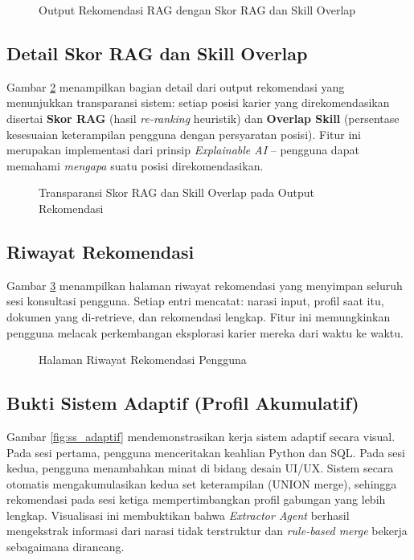 \begin{figure}[H]
  \centering
  \caption{Output Rekomendasi RAG dengan Skor RAG dan Skill Overlap}
  \label{fig:ss_response}
\end{figure}

\subsection{Detail Skor RAG dan Skill Overlap}

Gambar \ref{fig:ss_skor_rag} menampilkan bagian detail dari output rekomendasi yang
menunjukkan transparansi sistem: setiap posisi karier yang direkomendasikan disertai
\textbf{Skor RAG} (hasil \textit{re-ranking} heuristik) dan \textbf{Overlap Skill}
(persentase kesesuaian keterampilan pengguna dengan persyaratan posisi). Fitur ini
merupakan implementasi dari prinsip \textit{Explainable AI} -- pengguna dapat memahami
\textit{mengapa} suatu posisi direkomendasikan.

\begin{figure}[H]
  \centering
  \caption{Transparansi Skor RAG dan Skill Overlap pada Output Rekomendasi}
  \label{fig:ss_skor_rag}
\end{figure}

\subsection{Riwayat Rekomendasi}

Gambar \ref{fig:ss_riwayat} menampilkan halaman riwayat rekomendasi yang menyimpan
seluruh sesi konsultasi pengguna. Setiap entri mencatat: narasi input, profil saat itu,
dokumen yang di-retrieve, dan rekomendasi lengkap. Fitur ini memungkinkan pengguna
melacak perkembangan eksplorasi karier mereka dari waktu ke waktu.

\begin{figure}[H]
  \centering
  \caption{Halaman Riwayat Rekomendasi Pengguna}
  \label{fig:ss_riwayat}
\end{figure}

\subsection{Bukti Sistem Adaptif (Profil Akumulatif)}

Gambar \ref{fig:ss_adaptif} mendemonstrasikan kerja sistem adaptif secara visual.
Pada sesi pertama, pengguna menceritakan keahlian Python dan SQL. Pada sesi kedua,
pengguna menambahkan minat di bidang desain UI/UX. Sistem secara otomatis
mengakumulasikan kedua set keterampilan (UNION merge), sehingga rekomendasi
pada sesi ketiga mempertimbangkan profil gabungan yang lebih lengkap.
Visualisasi ini membuktikan bahwa \textit{Extractor Agent} berhasil mengekstrak
informasi dari narasi tidak terstruktur dan \textit{rule-based merge} bekerja
sebagaimana dirancang.

